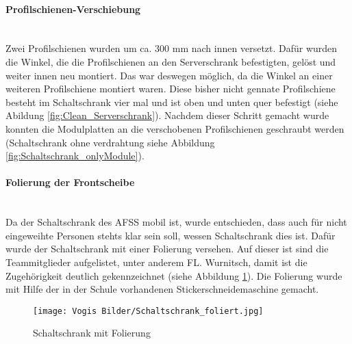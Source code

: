     \paragraph{Profilschienen-Verschiebung}\mbox{}\\
    Zwei Profilschienen wurden um ca. 300 mm nach innen versetzt. Dafür wurden die Winkel, die die Profilschienen an den Serverschrank befestigten, gelöst und weiter innen neu montiert. Das war deswegen möglich, da die Winkel an einer weiteren Profilschiene montiert waren. Diese bisher nicht gennate Profilschiene besteht im Schaltschrank vier mal und ist oben und unten quer befestigt (siehe Abildung \ref{fig:Clean_Serverschrank}). Nachdem dieser Schritt gemacht wurde konnten die Modulplatten an die verschobenen Profilschienen geschraubt werden (Schaltschrank ohne verdrahtung siehe Abbildung \ref{fig:Schaltschrank_onlyModule}).  
    \paragraph{Folierung der Frontscheibe}\mbox{}\\
    Da der Schaltschrank des AFSS mobil ist, wurde entschieden, dass auch für nicht eingeweihte Personen stehts klar sein soll, wessen Schaltschrank dies ist. Dafür wurde der Schaltschrank mit einer Folierung versehen. Auf dieser ist sind die Teammitglieder aufgelistet, unter anderem FL. Wurnitsch, damit ist die Zugehörigkeit deutlich gekennzeichnet (siehe Abbildung \ref{fig:Schaltschrank_foliert}). Die Folierung wurde mit Hilfe der in der Schule vorhandenen Stickerschneidemaschine gemacht.
    \begin{figure}[h]
        \centering
        \texttt{[image: Vogis Bilder/Schaltschrank\_foliert.jpg]}
        \caption{Schaltschrank mit Folierung}
        \label{fig:Schaltschrank_foliert}
    \end{figure}
